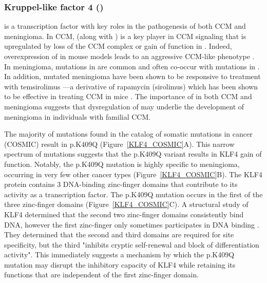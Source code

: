 \subsubsection{Kruppel-like factor 4 ()}
 is a transcription factor with key roles in the pathogenesis of both CCM and meningioma. In CCM,  (along with ) is a key player in CCM signaling that is upregulated by loss of the CCM complex or gain of function in  \citep{cuttano2016, zhou2016}. Indeed, overexpression of  in mouse models leads to an aggressive CCM-like phenotype \citep{ren2021}. In meningioma, mutations in  are common and often co-occur with mutations in  \citep{reuss2013}. In addition,  mutated meningioma have been shown to be responsive to treatment with temsirolimus \citep{vonSpreckelsen2020}—a derivative of rapamycin (sirolimus) which has been shown to be effective in treating CCM in mice \citep{ren2021}. The importance of  in both CCM and meningioma suggests that dysregulation of  may underlie the development of meningioma in individuals with familial CCM. 

The majority of  mutations found in the catalog of somatic mutations in cancer (COSMIC) result in p.K409Q (Figure~\ref{KLF4_COSMIC}A). This narrow spectrum of mutations suggests that the p.K409Q variant results in KLF4 gain of function. Notably, the p.K409Q mutation is highly specific to meningioma, occurring in very few other cancer types (Figure~\ref{KLF4_COSMIC}B). The KLF4 protein contains 3 DNA-binding zinc-finger domains that contribute to its activity as a transcription factor. The p.K409Q mutation occurs in the first of the three zinc-finger domains (Figure~\ref{KLF4_COSMIC}C). A structural study of KLF4 determined that the second two zinc-finger domains consistently bind DNA, however the first zinc-finger only sometimes participates in DNA binding \citep{schuetz2011}. They determined that the second and third domains are required for site specificity, but the third "inhibits cryptic self-renewal and block of differentiation activity". This immediately suggests a mechanism by which the p.K409Q mutation may disrupt the inhibitory capacity of KLF4 while retaining its functions that are independent of the first zinc-finger domain. 

